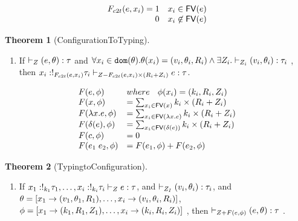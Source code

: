 \documentclass[a4paper,11pt]{article}
\theoremstyle{definition}
\newtheorem{thm}{Theorem}
\begin{document}
\clearpage
\[
  \begin{array}{ll}
    F_{c2t} (e, x_i) =   1 & x_i \in \mathsf{FV} (e) \\
        ~~~~~~~~~~~~~~~~~ 0 & x_i \not\in \mathsf{FV} (e)   
    \end{array}
  \]
  
\begin{thm}[ConfigurationToTyping]
  \label{c2t}
  \begin{enumerate} 
   \item If $ \vdash_{Z}  ( e, \theta) : \tau $ and $\forall
     x_i \in \mathtt{dom}(\theta). \theta(x_i) = (v_i, \theta_i, R_i) \land
     \exists Z_i . \vdash_{Z_i} (v_i, \theta_i) : \tau_i
     $ ,  then $ x_i : !_{ F_{c2t}(e, x_i) } \tau_i \vdash_{
       Z - F_{c2t}(e, x_i) \times (R_i + Z_i) } e: \tau $.
  \end{enumerate}
\end{thm}

 \clearpage

 \[
\begin{array}{ll}
 F(e, \phi ) & where \; ~~ \phi(x_i) = (k_i, R_i, Z_i ) \\
   F(x,\phi) & = \sum_{x_i \in \mathsf{FV} (x)  } k_i \times (R_i+ Z_i)  \\
F(\lambda x. e ,  \phi  ) & = \sum_{x_i \in \mathsf{FV} (\lambda x.e)  } k_i \times (R_i+ Z_i)   \\ 
F(\delta(e) , \phi ) & = \sum_{x_i \in \mathsf{FV} (\delta(e)) } k_i \times (R_i+ Z_i)  \\
F(c, \phi ) & = 0  \\
F(e_1 \; e_2, \phi ) & = F(e_1, \phi ) +
                                        F(e_2,\phi )
\end{array} 
\]

\begin{thm}[TypingtoConfiguration]
  \label{t2c}
  \begin{enumerate} 
   \item If $ x_1: !_{k_1} \tau_1, \ldots ,  x_i : !_{k_i} \tau_i
     \vdash_{Z} e: \tau$,  and $ \vdash_{Z_I } (v_i, \theta_i
    ) : \tau_i    $,  and $\theta = [ x_1
     \to (v_1, \theta_1, R_1), \ldots,  x_i \to (v_i, \theta_i,
     R_i)   ]$, $ \phi = [x_1
     \to (k_1, R_1, Z_1), \ldots,  x_i \to (k_i, R_i,
     Z_i)  ] $ , then   $
     \vdash_{Z +  F( e, \phi )  }
     ( e, \theta ) : \tau $ .
  \end{enumerate}
\end{thm}

\end{document}
